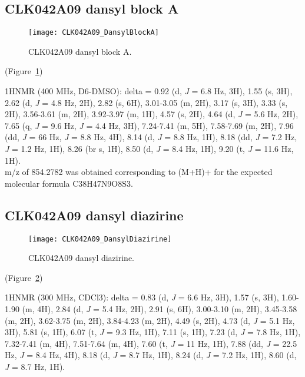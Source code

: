 \clearpage

\subsection{CLK042A09 dansyl block A}

\begin{figure}
\centering
\texttt{[image: CLK042A09\_DansylBlockA]}
\caption{CLK042A09 dansyl block A.}
\label{fig:CLK042A09_DansylBlockA}
\end{figure}

\noindent
(Figure~\ref{fig:CLK042A09_DansylBlockA})

\noindent
1HNMR (400 MHz, D6-DMSO): delta = 0.92 (d, {\it J} = 6.8 Hz, 3H), 1.55 (s, 3H), 2.62 (d, {\it J} = 4.8 Hz, 2H), 2.82 (s, 6H), 3.01-3.05 (m, 2H), 3.17 (s, 3H), 3.33 (s, 2H), 3.56-3.61 (m, 2H), 3.92-3.97 (m, 1H), 4.57 (s, 2H), 4.64 (d, {\it J} = 5.6 Hz, 2H), 7.65 (q, {\it J} = 9.6 Hz, {\it J} = 4.4 Hz, 3H), 7.24-7.41 (m, 5H), 7.58-7.69 (m, 2H), 7.96 (dd, {\it J} = 66 Hz, {\it J} = 8.8 Hz, 4H), 8.14 (d, {\it J} = 8.8 Hz, 1H), 8.18 (dd, {\it J} = 7.2 Hz, {\it J} = 1.2 Hz, 1H), 8.26 (br s, 1H), 8.50 (d, {\it J} = 8.4 Hz, 1H), 9.20 (t, {\it J} = 11.6 Hz, 1H). \\

\noindent
m/z of 854.2782 was obtained corresponding to (M+H)+ for the expected molecular formula C38H47N9O8S3. \\

\clearpage

\subsection{CLK042A09 dansyl diazirine}

\begin{figure}
\centering
\texttt{[image: CLK042A09\_DansylDiazirine]}
\caption{CLK042A09 dansyl diazirine.}
\label{fig:CLK042A09_DansylDiazirine}
\end{figure}

\noindent
(Figure~\ref{fig:CLK042A09_DansylDiazirine})

\noindent
1HNMR (300 MHz, CDCl3): delta = 0.83 (d, {\it J} = 6.6 Hz, 3H), 1.57 (s, 3H), 1.60-1.90 (m, 4H), 2.84 (d, {\it J} = 5.4 Hz, 2H), 2.91 (s, 6H), 3.00-3.10 (m, 2H), 3.45-3.58 (m, 2H), 3.62-3.75 (m, 2H), 3.84-4.23 (m, 2H), 4.49 (s, 2H), 4.73 (d, {\it J} = 5.1 Hz, 3H), 5.81 (s, 1H), 6.07 (t, {\it J} = 9.3 Hz, 1H), 7.11 (s, 1H), 7.23 (d, {\it J} = 7.8 Hz, 1H), 7.32-7.41 (m, 4H), 7.51-7.64 (m, 4H), 7.60 (t, {\it J} = 11 Hz, 1H), 7.88 (dd, {\it J} = 22.5 Hz, {\it J} = 8.4 Hz, 4H), 8.18 (d, {\it J} = 8.7 Hz, 1H), 8.24 (d, {\it J} = 7.2 Hz, 1H), 8.60 (d, {\it J} = 8.7 Hz, 1H). \\

